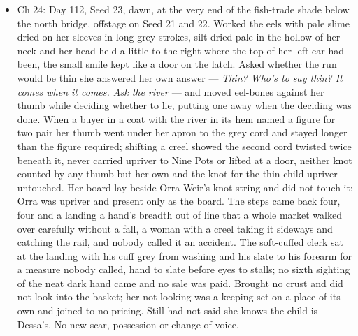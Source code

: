 \documentclass{design/chronicle}
\begin{document}
{\begin{itemize}[leftmargin=1.4em,itemsep=1pt,topsep=3pt,parsep=0pt]
\item Ch 24: Day 112, Seed 23, dawn, at the very end of the fish-trade shade below the north bridge, offstage on Seed 21 and 22. Worked the eels with pale slime dried on her sleeves in long grey strokes, silt dried pale in the hollow of her neck and her head held a little to the right where the top of her left ear had been, the small smile kept like a door on the latch. Asked whether the run would be thin she answered her own answer — \emph{Thin? Who’s to say thin? It comes when it comes. Ask the river} — and moved eel-bones against her thumb while deciding whether to lie, putting one away when the deciding was done. When a buyer in a coat with the river in its hem named a figure for two pair her thumb went under her apron to the grey cord and stayed longer than the figure required; shifting a creel showed the second cord twisted twice beneath it, never carried upriver to Nine Pots or lifted at a door, neither knot counted by any thumb but her own and the knot for the thin child upriver untouched. Her board lay beside Orra Weir’s knot-string and did not touch it; Orra was upriver and present only as the board. The steps came back four, four and a landing a hand’s breadth out of line that a whole market walked over carefully without a fall, a woman with a creel taking it sideways and catching the rail, and nobody called it an accident. The soft-cuffed clerk sat at the landing with his cuff grey from washing and his slate to his forearm for a measure nobody called, hand to slate before eyes to stalls; no sixth sighting of the neat dark hand came and no sale was paid. Brought no crust and did not look into the basket; her not-looking was a keeping set on a place of its own and joined to no pricing. Still had not said she knows the child is Dessa’s. No new scar, possession or change of voice.

\end{itemize}

\begin{itemize}[leftmargin=1.4em,itemsep=1pt,topsep=3pt,parsep=0pt]


\end{itemize}}
\end{document}

